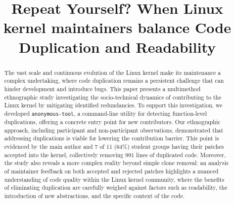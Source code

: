 \documentclass[10pt,conference]{IEEEtran}
\begin{document}
\title{Repeat Yourself? When Linux kernel maintainers balance Code Duplication and Readability}



\author{}


\maketitle

\begin{abstract}
The vast scale and continuous evolution of the Linux kernel make its maintenance a complex undertaking, where code duplication remains a persistent challenge that can hinder development and introduce bugs. This paper presents a multimethod ethnographic study investigating the socio-technical dynamics of contributing to the Linux kernel by mitigating identified redundancies. To support this investigation, we developed \texttt{anonymous-tool}, a command-line utility for detecting function-level duplications, offering a concrete entry point for new contributors. Our ethnographic approach, including participant and non-participant observations, demonstrated that addressing duplications is viable for lowering the contribution barrier. This point is evidenced by the main author and 7 of 11 (64\%) student groups having their patches accepted into the kernel, collectively removing 991 lines of duplicated code. Moreover, the study also reveals a more complex reality beyond simple clone removal: an analysis of maintainer feedback on both accepted and rejected patches highlights a nuanced understanding of code quality within the Linux kernel community, where the benefits of eliminating duplication are carefully weighed against factors such as readability, the introduction of new abstractions, and the specific context of the code.
\end{abstract}
\end{document}
